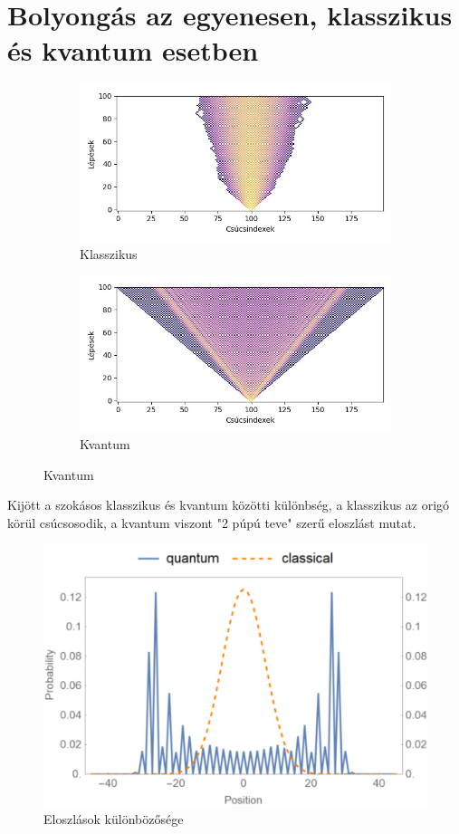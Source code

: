\section{Bolyongás az egyenesen, klasszikus és kvantum esetben}

\begin{figure}[H]
  \centering
  \begin{subfigure}{.45\linewidth}
    \centering
    \includegraphics[width=\linewidth]{./figures/quantum/classical_simulation_short.jpg}
    \caption{Klasszikus}
  \end{subfigure}
  \begin{subfigure}{.45\linewidth}
    \centering
    \includegraphics[width=\linewidth]{./figures/quantum/quantum_simulation_short.jpg}
    \caption{Kvantum}
  \end{subfigure}
\end{figure}

Kijött a szokásos klasszikus és kvantum közötti különbség, a klasszikus az
origó körül csúcsosodik, a kvantum viszont "2 púpú teve" szerű eloszlást mutat.

\begin{figure}[H]
  \centering
  \includegraphics[width=0.5\linewidth]{./figures/quantum/teve.png}
  \caption{Eloszlások különbözősége \cite{VicPina}}
\end{figure}

